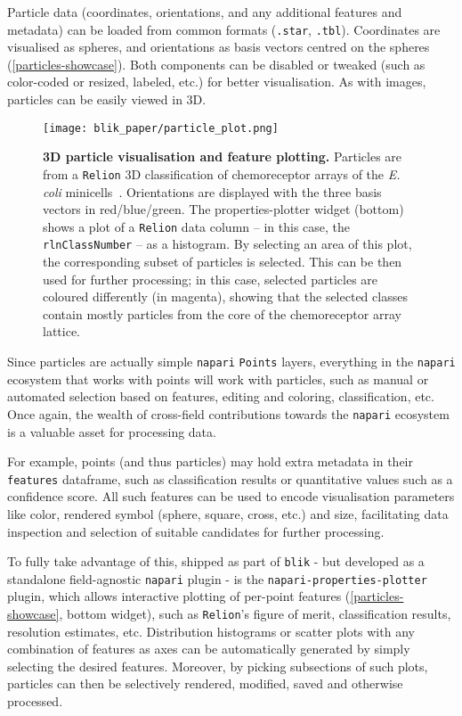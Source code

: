 Particle data (coordinates, orientations, and any additional features and metadata) can be loaded from common formats (\texttt{.star}, \texttt{.tbl}). Coordinates are visualised as spheres, and orientations as basis vectors centred on the spheres (\autoref{particles-showcase}). Both components can be disabled or tweaked (such as color-coded or resized, labeled, etc.) for better visualisation. As with images, particles can be easily viewed in 3D.

\begin{figure}[!ht]
    \centering
    \texttt{[image: blik\_paper/particle\_plot.png]}
    \caption[3D particle visualisation and feature plotting]{\textbf{3D particle visualisation and feature plotting.} Particles are from a \texttt{Relion} 3D classification of chemoreceptor arrays of the \textit{E. coli} minicells~\cite{burtCompleteStructureChemosensory2020}. Orientations are displayed with the three basis vectors in red/blue/green. The properties-plotter widget (bottom) shows a plot of a \texttt{Relion} data column -- in this case, the \texttt{rlnClassNumber} -- as a histogram. By selecting an area of this plot, the corresponding subset of particles is selected. This can be then used for further processing; in this case, selected particles are coloured differently (in magenta), showing that the selected classes contain mostly particles from the core of the chemoreceptor array lattice.}
    \label{particles-showcase}
\end{figure}

Since particles are actually simple \texttt{napari} \texttt{Points} layers, everything in the \texttt{napari} ecosystem that works with points will work with particles, such as manual or automated selection based on features, editing and coloring, classification, etc. Once again, the wealth of cross-field contributions towards the \texttt{napari} ecosystem is a valuable asset for processing data.

For example, points (and thus particles) may hold extra metadata in their \texttt{features} dataframe, such as classification results or quantitative values such as a confidence score. All such features can be used to encode visualisation parameters like color, rendered symbol (sphere, square, cross, etc.) and size, facilitating data inspection and selection of suitable candidates for further processing.

To fully take advantage of this, shipped as part of \texttt{blik} - but developed as a standalone field-agnostic \texttt{napari} plugin - is the \texttt{napari-properties-plotter} plugin, which allows interactive plotting of per-point features (\autoref{particles-showcase}, bottom widget), such as \texttt{Relion}'s figure of merit, classification results, resolution estimates, etc. Distribution histograms or scatter plots with any combination of features as axes can be automatically generated by simply selecting the desired features. Moreover, by picking subsections of such plots, particles can then be selectively rendered, modified, saved and otherwise processed.

